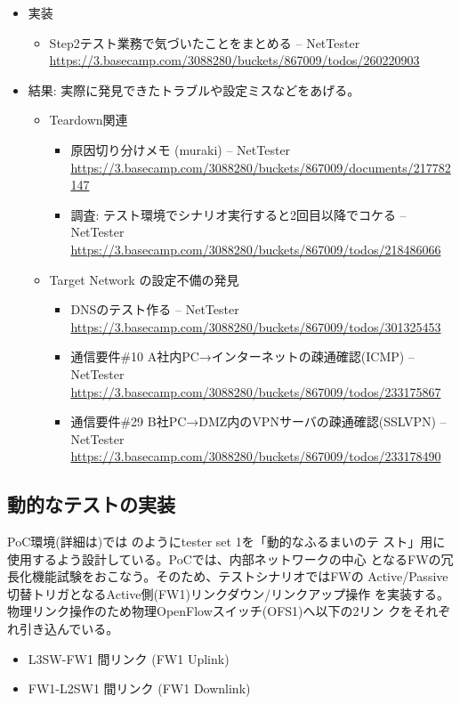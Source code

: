 \begin{itemize}
 \item 実装
       \begin{itemize}
        \item Step2テスト業務で気づいたことをまとめる – NetTester \url{https://3.basecamp.com/3088280/buckets/867009/todos/260220903}
       \end{itemize}
 \item 結果: 実際に発見できたトラブルや設定ミスなどをあげる。

       \begin{itemize}
        \item Teardown関連
              \begin{itemize}
               \item 原因切り分けメモ (muraki) – NetTester \url{https://3.basecamp.com/3088280/buckets/867009/documents/217782147}
               \item 調査: テスト環境でシナリオ実行すると2回目以降でコケる – NetTester \url{https://3.basecamp.com/3088280/buckets/867009/todos/218486066}
              \end{itemize}
        \item Target Network の設定不備の発見
              \begin{itemize}
               \item DNSのテスト作る – NetTester \url{https://3.basecamp.com/3088280/buckets/867009/todos/301325453}
               \item 通信要件\#10 A社内PC→インターネットの疎通確認(ICMP) – NetTester \url{https://3.basecamp.com/3088280/buckets/867009/todos/233175867}
               \item 通信要件\#29 B社PC→DMZ内のVPNサーバの疎通確認(SSLVPN) – NetTester \url{https://3.basecamp.com/3088280/buckets/867009/todos/233178490}
              \end{itemize}
       \end{itemize}
\end{itemize}

\subsection{動的なテストの実装}


PoC環境(詳細は)では
のようにtester set 1を「動的なふるまいのテ
スト」用に使用するよう設計している。PoCでは、\yo 内部ネットワークの中心
となるFWの冗長化機能試験をおこなう。そのため、テストシナリオではFWの
Active/Passive切替トリガとなるActive側(FW1)リンクダウン/リンクアップ操作
を実装する。物理リンク操作のため物理OpenFlowスイッチ(OFS1)へ以下の2リン
クをそれぞれ引き込んでいる。
\begin{itemize}
 \item L3SW-FW1 間リンク (FW1 Uplink)
 \item FW1-L2SW1 間リンク (FW1 Downlink)
\end{itemize}

